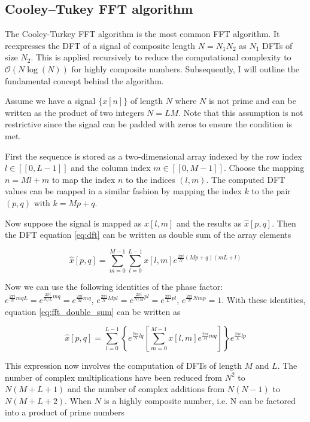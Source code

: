 \subsection{Cooley–Tukey FFT algorithm}

The Cooley-Turkey FFT algorithm is the most common FFT algorithm. It reexpresses the DFT of a signal of composite length $N = N_1 N_2$ as $N_1$ DFTs of size $N_2$. This is 
applied recursively to reduce the computational complexity to $\mathcal{O}(N \log(N))$ for highly composite numbers. Subsequently, I will outline the
fundamental concept behind the algorithm.

Assume we have a signal $\{ x[n] \}$ of length $N$ where $N$ is not prime and can be written as the product of two integers $N = LM$. Note that this assumption is not restrictive 
since the signal can be padded with zeros to ensure the condition is met. 

First the sequence is stored as a two-dimensional array indexed by the row index $l \in [\![0, L-1]\!]$ and the column index $m \in [\![0, M-1]\!]$. Choose the mapping $n = M l + m$
to map the index $n$ to the indices $(l,m)$. The computed DFT values can be mapped in a similar fashion by mapping the index $k$ to the pair $(p,q)$ with $k = Mp +q$.

Now suppose the signal is mapped as $x[l,m]$ and the results as $\widehat{x}[p,q]$. Then the DFT equation \ref{eq:dft} can be written as double sum of the array elements

\begin{equation}
    \widehat{x}[p,q] = \sum_{m=0}^{M-1}\sum_{l=0}^{L-1} x[l, m] e^{\frac{2 \pi i}{N}(Mp + q)(mL + l)}
    \label{eq:fft_double_sum}
\end{equation}

Now we can use the following identities of the phase factor: $e^{\frac{2 \pi i }{N}mqL} = e^{\frac{2 \pi i }{N/L}mq} = e^{\frac{2 \pi i }{M}mq} $, 
$e^{\frac{2 \pi i }{N}Mpl} = e^{\frac{2 \pi i }{N/M}pl} = e^{\frac{2 \pi i }{L}pl}$, $e^{\frac{2 \pi i }{N}Nmp} = 1$.
With these identities, equation \ref{eq:fft_double_sum} can be written as 

\begin{equation}
    \widehat{x}[p, q] = \sum_{l=0}^{L-1} \left\{ e^{\frac{2 \pi i }{N}lq} \left[  \sum_{m=0}^{M-1}x[l, m] e^{\frac{2 \pi i }{M}mq} \right] \right\} e^{\frac{2 \pi i }{L}lp}
\end{equation}

This expression now involves the computation of DFTs of length $M$ and $L$. The number of complex multiplications have been reduced from $N^2$ to $N(M+L+1)$ and the number of complex
additions from $N(N-1)$ to $N(M+L+2)$. When $N$ is a highly composite number, i.e. N can be factored into a product of prime numbers

